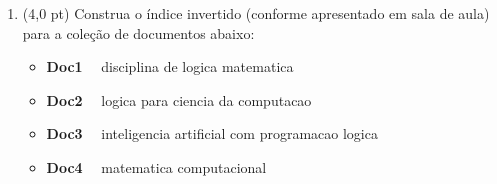 \documentclass[12pt,a4paper,oneside]{article}
\begin{document}
\begin{enumerate}
	\newpage
	
	\item (4,0 pt) Construa o índice invertido (conforme apresentado em sala de aula) para a coleção de documentos abaixo:
		
		\begin{itemize}
			\item[] {\bf Doc1} \ \ disciplina de logica matematica
			\item[] {\bf Doc2} \ \ logica para ciencia da computacao
			\item[] {\bf Doc3} \ \ inteligencia artificial com programacao logica
			\item[] {\bf Doc4} \ \ matematica computacional
		\end{itemize}
	
	\end{enumerate}
\end{document}
